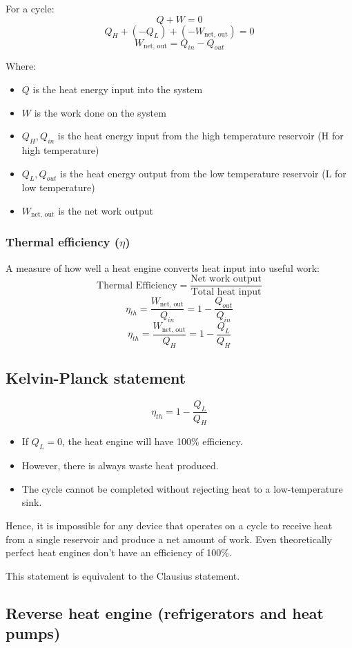 \documentclass[11pt]{article}
\begin{document}
For a cycle:
\[Q + W = 0\]
\[Q_H + (-Q_L) + (-W_{\text{net, out}}) = 0\]
\[W_{\text{net, out}} = Q_{in} - Q_{out}\]

Where:
\begin{itemize}
\item \(Q\) is the heat energy input into the system
\item \(W\) is the work done on the system
\item \(Q_H, Q_{in}\) is the heat energy input from the high temperature reservoir (H for high temperature)
\item \(Q_L, Q_{out}\) is the heat energy output from the low temperature reservoir (L for low temperature)
\item \(W_{\text{net, out}}\) is the net work output
\end{itemize}
\subsubsection{Thermal efficiency (\(\eta\))}
\label{sec:orgfd99914}
A measure of how well a heat engine converts heat input into useful work:
\[\text{Thermal Efficiency} = \frac{\text{Net work output}}{\text{Total heat input}}\]
\[\eta_{th} = \frac{W_{\text{net, out}}}{Q_{in}} = 1 - \frac{Q_{out}}{Q_{in}}\]
\[\eta_{th} = \frac{W_{\text{net, out}}}{Q_{H}} = 1 - \frac{Q_L}{Q_H}\]

 \newpage
\subsection{Kelvin-Planck statement}
\label{sec:org0fae7a5}
\[\eta_{th} = 1 - \frac{Q_L}{Q_H}\]
\begin{itemize}
\item If \(Q_L = 0\), the heat engine will have 100\% efficiency.
\item However, there is always waste heat produced.
\item The cycle cannot be completed without rejecting heat to a low-temperature sink.
\end{itemize}

Hence, it is impossible for any device that operates on a cycle to receive heat from a single reservoir and produce a net amount of work. Even theoretically perfect heat engines don't have an efficiency of 100\%.

This statement is equivalent to the Clausius statement.

 \newpage
\subsection{Reverse heat engine (refrigerators and heat pumps)}
\label{sec:org61dfc4a}
\end{document}
